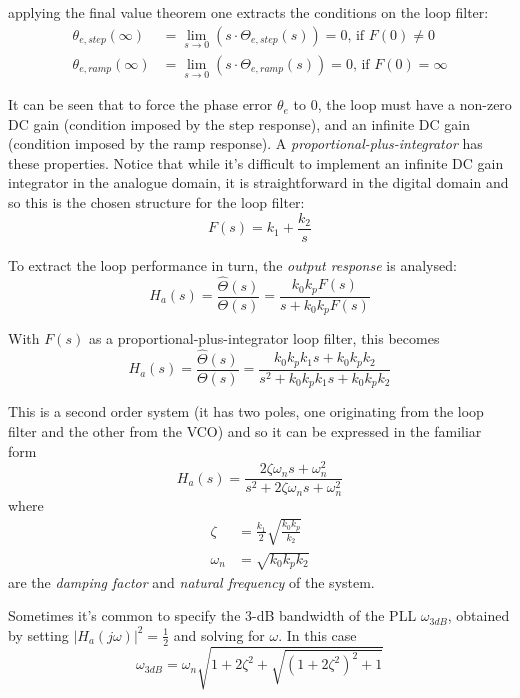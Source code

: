 applying the final value theorem one extracts the conditions on the loop filter:
\begin{align}
\theta_{e,step}(\infty) & =\lim_{s\to 0}\left(s\cdot\Theta_{e,step}(s)\right)=0\text{, if }F(0)\neq0\\
\theta_{e,ramp}(\infty) & =\lim_{s\to 0}\left(s\cdot\Theta_{e,ramp}(s)\right)=0\text{, if }F(0)=\infty
\end{align}

It can be seen that to force the phase error $\theta_e$ to 0, the loop must have a non-zero DC gain (condition imposed by the step response), and an infinite DC gain (condition imposed by the ramp response). A \emph{proportional-plus-integrator} has these properties. Notice that while it's difficult to implement an infinite DC gain integrator in the analogue domain, it is straightforward in the digital domain and so this is the chosen structure for the loop filter:
\begin{equation}F(s)=k_1+\frac{k_2}{s}\end{equation}

To extract the loop performance in turn, the \emph{output response} is analysed:
\begin{equation}H_a(s)=\frac{\hat\Theta(s)}{\Theta(s)}=\frac{k_0 k_p F(s)}{s+k_0 k_p F(s)}\end{equation}

With $F(s)$ as a proportional-plus-integrator loop filter, this becomes
\begin{equation}H_a(s)=\frac{\hat\Theta(s)}{\Theta(s)}=\frac{k_0 k_p k_1 s + k_0 k_p k_2}{s^2+k_0 k_p k_1 s + k_0 k_p k_2}\end{equation}

This is a second order system (it has two poles, one originating from the loop filter and the other from the VCO) and so it can be expressed in the familiar form
\begin{equation} \label{eq:Ha_s}
  H_a(s)=\frac{2\zeta \omega_n s+\omega_n^2}{s^2+2\zeta \omega_n s+\omega_n^2}
\end{equation}
where
\begin{align}
\zeta & =\frac{k_1}{2}\sqrt{\frac{k_0 k_p}{k_2}}\\
\omega_n & = \sqrt{k_0 k_p k_2}
\end{align}
are the \emph{damping factor} and \emph{natural frequency} of the system.

Sometimes it's common to specify the 3-dB bandwidth of the PLL $\omega_{3dB}$, obtained by setting $|H_a(j\omega)|^2=\frac{1}{2}$ and solving for $\omega$. In this case
\begin{equation}\omega_{3dB}=\omega_n \sqrt{1+2\zeta^2+\sqrt{(1+2\zeta^2)^2+1}}\end{equation}

